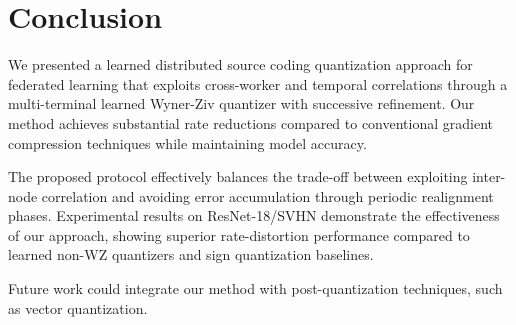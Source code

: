 \section{Conclusion}
\label{sec:conclusion}

We presented a learned distributed source coding quantization approach for federated learning that exploits cross-worker and temporal correlations through a multi-terminal learned Wyner-Ziv quantizer with successive refinement. Our method achieves substantial rate reductions compared to conventional gradient compression techniques while maintaining model accuracy.

The proposed protocol effectively balances the trade-off between exploiting inter-node correlation and avoiding error accumulation through periodic realignment phases. Experimental results on ResNet-18/SVHN demonstrate the effectiveness of our approach, showing superior rate-distortion performance compared to learned non-WZ quantizers and sign quantization baselines.

Future work could integrate our method with post-quantization techniques, such as vector quantization.

